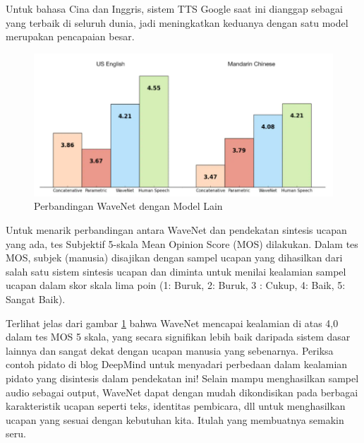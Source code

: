 Untuk bahasa Cina dan Inggris, sistem TTS Google saat ini dianggap sebagai yang terbaik di seluruh dunia, jadi meningkatkan keduanya dengan satu model merupakan pencapaian besar.

\begin{figure}[H]
        \centerline{\includegraphics[scale=.5]{figures/wavenet}}
        \caption{Perbandingan WaveNet dengan Model Lain}
		\label{wavenet}
\end{figure}
Untuk menarik perbandingan antara WaveNet dan pendekatan sintesis ucapan yang ada, tes Subjektif 5-skala Mean Opinion Score (MOS) dilakukan. Dalam tes MOS, subjek (manusia) disajikan dengan sampel ucapan yang dihasilkan dari salah satu sistem sintesis ucapan dan diminta untuk menilai kealamian sampel ucapan dalam skor skala lima poin (1: Buruk, 2: Buruk, 3 : Cukup, 4: Baik, 5: Sangat Baik).

Terlihat jelas dari gambar \ref{wavenet} bahwa WaveNet mencapai kealamian di atas 4,0 dalam tes MOS 5 skala, yang secara signifikan lebih baik daripada sistem dasar lainnya dan sangat dekat dengan ucapan manusia yang sebenarnya. Periksa contoh pidato di blog DeepMind untuk menyadari perbedaan dalam kealamian pidato yang disintesis dalam pendekatan ini! Selain mampu menghasilkan sampel audio sebagai output, WaveNet dapat dengan mudah dikondisikan pada berbagai karakteristik ucapan seperti teks, identitas pembicara, dll untuk menghasilkan ucapan yang sesuai dengan kebutuhan kita. Itulah yang membuatnya semakin seru.

